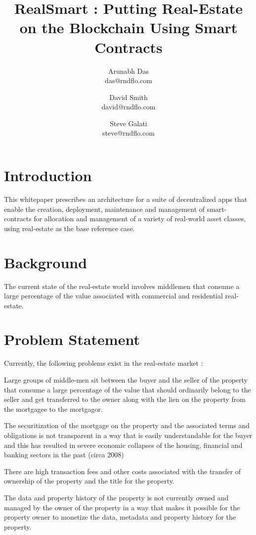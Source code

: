 \documentclass{article}
\author{Arunabh Das \\ {das@rndflo.com}
   \and David Smith \\ {david@rndflo.com} 
   \and Steve Galati \\ {steve@rndflo.com} }
\title{RealSmart : Putting Real-Estate on the Blockchain Using Smart Contracts}
\date{\vspace{-5ex}}
\begin{document}
\maketitle

\section{Introduction}


This whitepaper prescribes an architecture for a suite of decentralized apps that enable the creation, 
deployment, maintenance and management of smart-contracts for allocation and management of a variety 
of real-world asset classes, using real-estate as the base reference case.




\section{Background}


The current state of the real-estate world involves middlemen that consume a large percentage of the 
value associated with commercial and residential real-estate.

\section{Problem Statement}


Currently, the following problems exist in the real-estate market :

Large groups of middle-men sit between the buyer and the seller of the property that consume a large 
percentage of the value that should ordinarily belong to the seller and get transferred to the owner 
along with the lien on the property from the mortgagee to the mortgagor.


The securitization of the mortgage on the property and the associated terms and obligations is not 
transparent in a way that is easily understandable for the buyer and this has resulted in severe 
economic collapses of the housing, financial and banking sectors in the past (circa 2008)


There are high transaction fees and other costs associated with the transfer of ownership of the property 
and the title for the property.


The data and property history of the property is not currently owned and managed by the owner of the 
property in a way that makes it possible for the property owner to monetize the data, metadata and property history for the property.
\end{document}
